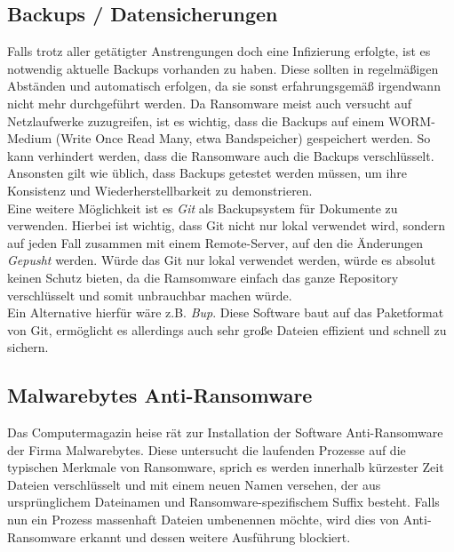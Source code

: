 \subsection{Backups / Datensicherungen}

	Falls trotz aller getätigter Anstrengungen doch eine Infizierung erfolgte, ist es notwendig aktuelle Backups vorhanden zu haben. Diese sollten in regelmäßigen Abständen und automatisch erfolgen, da sie sonst erfahrungsgemäß irgendwann nicht mehr durchgeführt werden. Da Ransomware meist auch versucht auf Netzlaufwerke zuzugreifen, ist es wichtig, dass die Backups auf einem WORM-Medium (Write Once Read Many, etwa Bandspeicher) gespeichert werden. So kann verhindert werden, dass die Ransomware auch die Backups verschlüsselt.\\
	Ansonsten gilt wie üblich, dass Backups getestet werden müssen, um ihre Konsistenz und Wiederherstellbarkeit zu demonstrieren.\\
	Eine weitere Möglichkeit ist es \textit{Git} als Backupsystem für Dokumente zu verwenden. Hierbei ist wichtig, dass Git nicht nur lokal verwendet wird, sondern auf jeden Fall zusammen mit einem Remote-Server, auf den die Änderungen \textit{Gepusht} werden. Würde das Git nur lokal verwendet werden, würde es absolut keinen Schutz bieten, da die Ramsomware einfach das ganze Repository verschlüsselt und somit unbrauchbar machen würde.\\
	Ein Alternative hierfür wäre z.B. \textit{Bup}. Diese Software baut auf das Paketformat von Git, ermöglicht es allerdings auch sehr große Dateien effizient und schnell zu sichern.\cite{bup}
	
	
	
\subsection{Malwarebytes Anti-Ransomware}

	Das Computermagazin \glqq heise\grqq{} rät zur Installation der Software \glqq Anti-Ransomware\grqq{} der Firma Malwarebytes. Diese untersucht die laufenden Prozesse auf die typischen Merkmale von Ransomware, sprich es werden innerhalb kürzester Zeit Dateien verschlüsselt und mit einem neuen Namen versehen, der aus ursprünglichem Dateinamen und Ransomware-spezifischem Suffix besteht. Falls nun ein Prozess massenhaft Dateien umbenennen möchte, wird dies von \glqq Anti-Ransomware\glqq{} erkannt und dessen weitere Ausführung blockiert\cite{malwarebytes}.

